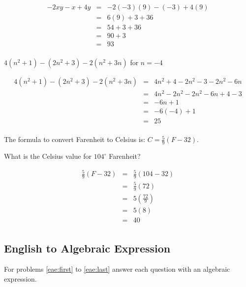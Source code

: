 \documentclass[fleqn,addpoints]{exam}
\begin{document}
\begin{questions}
\begin{solution}[3 cm]
  \begin{eqnarray*}
     -2xy - x + 4y  & = & -2(-3)(9) - (-3) + 4(9) \\
      & = & 6(9) + 3 + 36  \\
      & = & 54 + 3 + 36 \\
      & = & 90 + 3 \\
      & = & 93 \\
  \end{eqnarray*}
\end{solution}

\question[5]
\( 4(n^2 + 1) - (2n^2 + 3) -2(n^2 + 3n) \) for \( n = -4 \)

\begin{solution}[3 cm]
  \begin{eqnarray*}
     4(n^2 + 1) - (2n^2 + 3) -2(n^2 + 3n)   & = & 4n^2 + 4 - 2n^2 - 3 -2n^2 - 6n \\
      & = & 4n^2 - 2n^2 - 2n^2 -6n + 4 - 3 \\
      & = & -6n + 1 \\
      & = & -6(-4) + 1 \\
      & = & 25 \\
  \end{eqnarray*}
\end{solution}

\question[5]  \label{ae:last}
The formula to convert Farenheit to Celsius is: \(\displaystyle C = \frac{5}{9}(F - 32) \). 

What is the Celsius value for \(104^{\circ}\) Farenheit? 

\begin{solution}[3 cm]
  \begin{eqnarray*}
      \frac{5}{9}(F - 32) & = & \frac{5}{9}(104 - 32) \\
      & = & \frac{5}{9}(72) \\
      & = & 5(\frac{72}{9}) \\
      & = & 5(8) \\
      & = & 40 \\
  \end{eqnarray*}
\end{solution}

\subsection{English to Algebraic Expression}

For problems \ref{eae:first} to \ref{eae:last} answer each question with an algebraic expression.


\end{questions}
\end{document}
